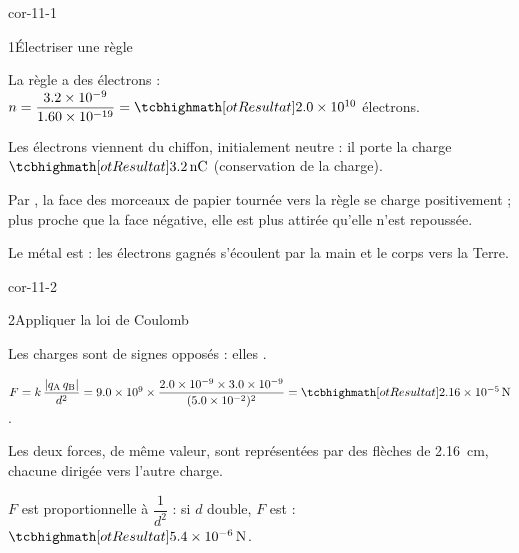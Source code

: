 \corrigesSouples

\begin{blocLivre}{cor-11-1}
\begin{corrige}{1}{Électriser une règle}
\begin{questions}
\item La règle a  des électrons : $n=\dfrac{\num{3,2e-9}}{\num{1,60e-19}}=\res{\num{2,0e10}}$ électrons.
\item Les électrons viennent du chiffon, initialement neutre : il porte la charge $\res{\qty{+3,2}{nC}}$ (conservation de la charge).
\item Par , la face des morceaux de papier tournée vers la règle se charge positivement ; plus proche que la face
négative, elle est plus attirée qu'elle n'est repoussée.
\item Le métal est  : les électrons gagnés s'écoulent par la main et le corps vers la Terre.
\end{questions}
\end{corrige}
\end{blocLivre}
\begin{blocLivre}{cor-11-2}
\begin{corrige}{2}{Appliquer la loi de Coulomb}
\begin{questions}
\item Les charges sont de signes opposés : elles .
\item $F=k\,\dfrac{|q_\mathrm{A}\,q_\mathrm{B}|}{d^2}=\num{9,0e9}\times\dfrac{\num{2,0e-9}\times\num{3,0e-9}}{(\num{5,0e-2})^2}=\res{\qty{2,16e-5}{N}}$.
\item Les deux forces, de même valeur, sont représentées par des flèches de \qty{2,16}{cm}, chacune dirigée vers l'autre charge.
\item $F$ est proportionnelle à $\dfrac{1}{d^2}$ : si $d$ double, $F$ est  : $\res{\qty{5,4e-6}{N}}$.
\end{questions}
\end{corrige}
\end{blocLivre}
